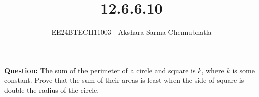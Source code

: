 \documentclass[journal]{IEEEtran}
\begin{document}

\vspace{3cm}

\title{12.6.6.10}
\author{EE24BTECH11003 - Akshara Sarma Chennubhatla}
{\let\newpage\relax\maketitle}
\textbf{Question:}
The sum of the perimeter of a circle and square is $k$, where $k$ is some constant. Prove that the sum of their areas is least when the side of square is double the radius of the circle.

\solution\\
\end{document}
